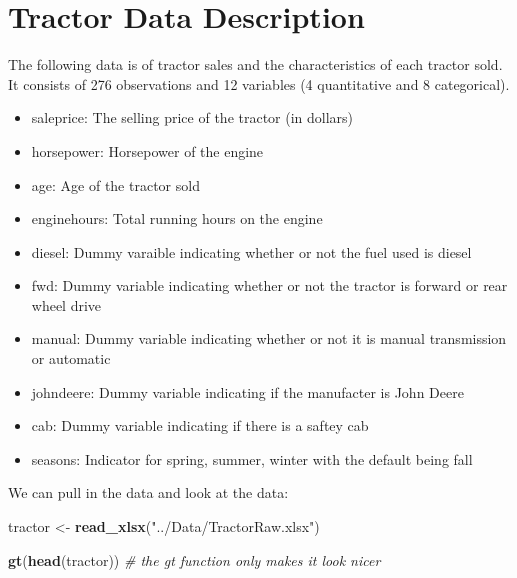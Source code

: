 \documentclass[
]{article}
\newenvironment{Shaded}{\begin{snugshade}}{\end{snugshade}}
\newcommand{\CommentTok}[1]{\textcolor[rgb]{0.56,0.35,0.01}{\textit{#1}}}
\newcommand{\FunctionTok}[1]{\textcolor[rgb]{0.13,0.29,0.53}{\textbf{#1}}}
\newcommand{\NormalTok}[1]{#1}
\newcommand{\OtherTok}[1]{\textcolor[rgb]{0.56,0.35,0.01}{#1}}
\newcommand{\StringTok}[1]{\textcolor[rgb]{0.31,0.60,0.02}{#1}}
\providecommand{\tightlist}{%
  \setlength{\itemsep}{0pt}\setlength{\parskip}{0pt}}
\begin{document}
\section{Tractor Data Description}\label{tractor-data-description}

The following data is of tractor sales and the characteristics of each
tractor sold. It consists of 276 observations and 12 variables (4
quantitative and 8 categorical).

\begin{itemize}
\tightlist
\item
  saleprice: The selling price of the tractor (in dollars)
\item
  horsepower: Horsepower of the engine
\item
  age: Age of the tractor sold
\item
  enginehours: Total running hours on the engine
\item
  diesel: Dummy varaible indicating whether or not the fuel used is
  diesel
\item
  fwd: Dummy variable indicating whether or not the tractor is forward
  or rear wheel drive
\item
  manual: Dummy variable indicating whether or not it is manual
  transmission or automatic
\item
  johndeere: Dummy variable indicating if the manufacter is John Deere
\item
  cab: Dummy variable indicating if there is a saftey cab
\item
  seasons: Indicator for spring, summer, winter with the default being
  fall
\end{itemize}

We can pull in the data and look at the data:

\begin{Shaded}
\begin{Highlighting}[]
\NormalTok{tractor }\OtherTok{\textless{}{-}} \FunctionTok{read\_xlsx}\NormalTok{(}\StringTok{"../Data/TractorRaw.xlsx"}\NormalTok{)}

\FunctionTok{gt}\NormalTok{(}\FunctionTok{head}\NormalTok{(tractor)) }\CommentTok{\# the gt function only makes it look nicer}
\end{Highlighting}
\end{Shaded}
\end{document}
